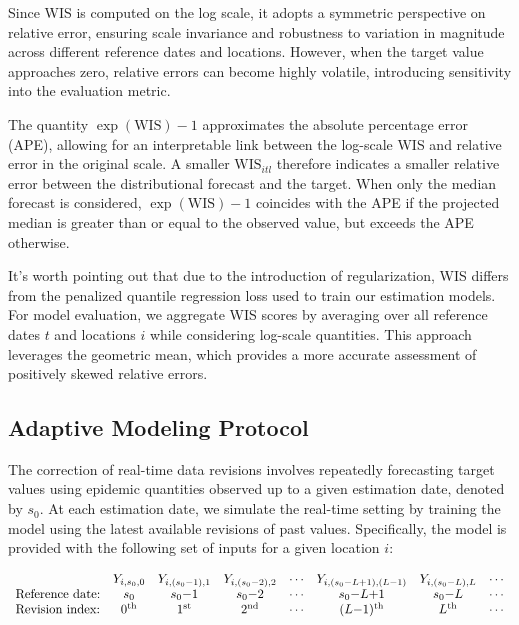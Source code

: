 Since WIS is computed on the log scale, it adopts a symmetric perspective on relative error, ensuring scale invariance and robustness to variation in magnitude across different reference dates and locations. However, when the target value approaches zero, relative errors can become highly volatile, introducing sensitivity into the evaluation metric.

The quantity $\exp(\text{WIS}) - 1$ approximates the absolute percentage error (APE), allowing for an interpretable link between the log-scale WIS and relative error in the original scale. A smaller $\text{WIS}_{itl}$ therefore indicates a smaller relative error between the distributional forecast and the target. When only the median forecast is considered, $\exp(\text{WIS}) - 1$ coincides with the APE if the projected median is greater than or equal to the observed value, but exceeds the APE otherwise. 

It's worth pointing out that due to the introduction of regularization, WIS differs from the penalized quantile regression loss used to train our estimation models. For model evaluation, we aggregate WIS scores by averaging over all reference dates $t$ and locations $i$ while considering log-scale quantities. This approach leverages the geometric mean, which provides a more accurate assessment of positively skewed relative errors.

\subsection{Adaptive Modeling Protocol}

The correction of real-time data revisions involves repeatedly forecasting target values using epidemic quantities observed up to a given estimation date, denoted by $s_0$. At each estimation date, we simulate the real-time setting by training the model using the latest available revisions of past values. Specifically, the model is provided with the following set of inputs for a given location $i$:

{\scriptsize
\[
\begin{array}{lccccccc}
 & Y_{i,s_0,0} & Y_{i,(s_0{-}1),1} & Y_{i,(s_0{-}2),2} & \cdots & Y_{i,(s_0{-}L{+}1),(L{-}1)} & Y_{i,(s_0{-}L),L} &\cdots \\
\text{Reference date:} & s_0 & s_0{-}1 & s_0{-}2 & \cdots & s_0{-}L{+}1 & s_0{-}L &\cdots\\
\text{Revision index:} & 0\textsuperscript{th} & 1\textsuperscript{st} & 2\textsuperscript{nd} & \cdots & (L{-}1)\textsuperscript{th} & L\textsuperscript{th}&\cdots
\end{array}
\]
}


